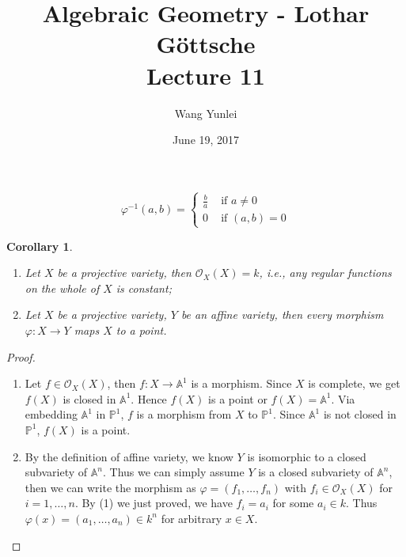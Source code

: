 \documentclass{amsart}
\theoremstyle{plain}
\newtheorem{corollary}{Corollary}
\theoremstyle{definition}
\theoremstyle{remark}
\numberwithin{equation}{section}
\begin{document}
\title[Complete-simple distributive lattices]
{Algebraic Geometry - Lothar G\"{o}ttsche \\
	Lecture 11}
\author{Wang Yunlei}
\date{June 19, 2017}
\maketitle
$$
\varphi^{-1}(a,b)=\left\lbrace \begin{matrix}
\frac{b}{a} & \text{ if } a\neq 0\\
0 & \text{ if } (a,b)=0
\end{matrix}\right.
$$
\begin{corollary}
	\noindent\begin{enumerate}
		\item Let $ X $ be a projective variety, then $ \mathcal{O}_X(X)=k $, i.e., any regular functions on the whole of $ X $ is constant;		
		\item Let $ X $ be a projective variety, $ Y $ be an affine variety, then every morphism $ \varphi:X\to Y $ maps $ X $ to a point.
	\end{enumerate}
\end{corollary}
\begin{proof}
	\noindent\begin{enumerate}
		\item Let $ f\in\mathcal{O}_X(X) $, then $ f:X\to \mathbb{A}^1 $ is a morphism. Since $ X $ is complete, we get $ f(X) $ is closed in $ \mathbb{A}^1 $. Hence $ f(X) $ is a point or $ f(X)=\mathbb{A}^1 $. Via embedding $ \mathbb{A}^1 $ in $ \mathbb{P}^1 $, $ f $ is a morphism from $ X $ to $ \mathbb{P}^1 $. Since $ \mathbb{A}^1 $ is not closed in $ \mathbb{P}^1 $, $ f(X) $ is a point.
		\item By the definition of affine variety, we know $ Y $ is isomorphic to a closed subvariety of $ \mathbb{A}^n $. Thus we can simply assume $ Y $ is a closed subvariety of $ \mathbb{A}^n $, then we can write the morphism as $ \varphi=(f_1,\dots,f_n) $ with $ f_i\in \mathcal{O}_X(X) $ for $ i=1,\dots,n $. By (1) we just proved, we have $ f_i =a_i$ for some $ a_i\in k $. Thus $ \varphi(x)=(a_1,\dots,a_n)\in k^n $ for arbitrary $ x\in X $.
	\end{enumerate}
\end{proof}
\end{document}
